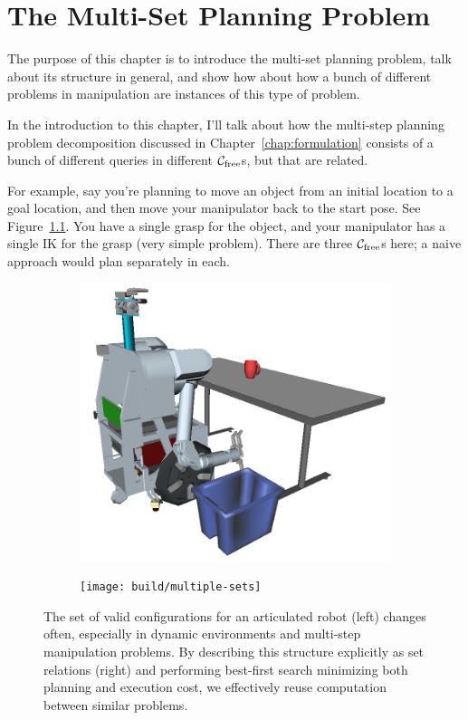 \chapter{The Multi-Set Planning Problem}
\label{chap:multi-set}

The purpose of this chapter is to introduce the multi-set planning
problem,
talk about its structure in general,
and show how about how a bunch of different problems in manipulation
are instances of this type of problem.

In the introduction to this chapter,
I'll talk about how the multi-step planning problem decomposition
discussed in Chapter~\ref{chap:formulation}
consists of a bunch of different queries in different
$\mathcal{C}_{\mbox{\scriptsize free}}$s, but that are related.

For example, say you're planning to move an object from an initial
location to a goal location,
and then move your manipulator back to the start pose.
See Figure~\ref{fig:manip-example}.
You have a single grasp for the object,
and your manipulator has a single IK for the grasp (very simple problem).
There are three $\mathcal{C}_{\mbox{\scriptsize free}}$s here;
a naive approach would plan separately in each.

\begin{figure}
\centering
\begin{subfigure}[b]{.45\linewidth}
\includegraphics[width=\columnwidth]{figs/simple-table-clearing-task.png}
\end{subfigure}%
\quad%
\begin{subfigure}[b]{.45\linewidth}
\texttt{[image: build/multiple-sets]}
\end{subfigure}
\caption{
  The set of valid configurations for an articulated robot (left)
  changes often,
  especially in dynamic environments
  and multi-step manipulation problems.
  By describing this structure explicitly as set relations (right)
  and performing best-first search
  minimizing both planning and execution cost,
  we effectively reuse computation between similar
  problems.}
\label{fig:manip-example}
\end{figure}

